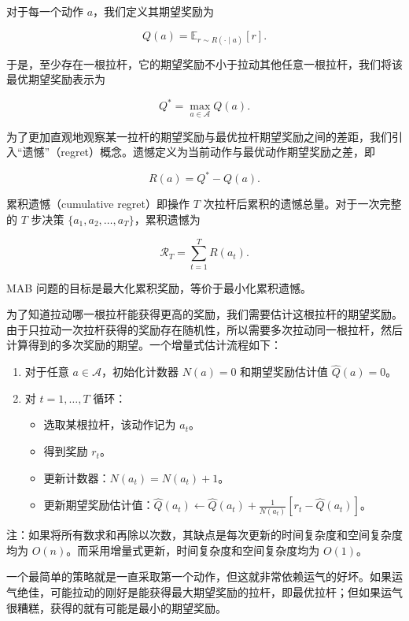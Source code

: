 对于每一个动作 \(a\)，我们定义其期望奖励为

\[
Q(a)=\mathbb{E}_{r\sim R(\cdot\mid a)}[r].
\]

于是，至少存在一根拉杆，它的期望奖励不小于拉动其他任意一根拉杆，我们将该最优期望奖励表示为

\[
Q^{*}=\max_{a\in\mathcal{A}} Q(a).
\]

为了更加直观地观察某一拉杆的期望奖励与最优拉杆期望奖励之间的差距，我们引入``遗憾''（regret）概念。遗憾定义为当前动作与最优动作期望奖励之差，即

\[
R(a)=Q^{*}-Q(a).
\]

累积遗憾（cumulative regret）即操作 \(T\) 次拉杆后累积的遗憾总量。对于一次完整的 \(T\) 步决策 \(\{a_1,a_2,\ldots,a_T\}\)，累积遗憾为

\[
\mathcal{R}_T=\sum_{t=1}^{T} R(a_t).
\]

MAB 问题的目标是最大化累积奖励，等价于最小化累积遗憾。

为了知道拉动哪一根拉杆能获得更高的奖励，我们需要估计这根拉杆的期望奖励。由于只拉动一次拉杆获得的奖励存在随机性，所以需要多次拉动同一根拉杆，然后计算得到的多次奖励的期望。一个增量式估计流程如下：

\begin{enumerate}
\def\labelenumi{\arabic{enumi}.}
\tightlist
\item
  对于任意 \(a\in\mathcal{A}\)，初始化计数器 \(N(a)=0\) 和期望奖励估计值 \(\hat{Q}(a)=0\)。
\item
{}
  对 \(t=1,\ldots,T\) 循环：

  \begin{itemize}
  \tightlist
  \item
    选取某根拉杆，该动作记为 \(a_t\)。
  \item
    得到奖励 \(r_t\)。
  \item
    更新计数器：\(N(a_t)=N(a_t)+1\)。
  \item
    更新期望奖励估计值：\(\hat{Q}(a_t)\leftarrow \hat{Q}(a_t)+\frac{1}{N(a_t)}[r_t-\hat{Q}(a_t)]\)。
  \end{itemize}
\end{enumerate}

注：如果将所有数求和再除以次数，其缺点是每次更新的时间复杂度和空间复杂度均为 \(O(n)\)。而采用增量式更新，时间复杂度和空间复杂度均为 \(O(1)\)。

一个最简单的策略就是一直采取第一个动作，但这就非常依赖运气的好坏。如果运气绝佳，可能拉动的刚好是能获得最大期望奖励的拉杆，即最优拉杆；但如果运气很糟糕，获得的就有可能是最小的期望奖励。

